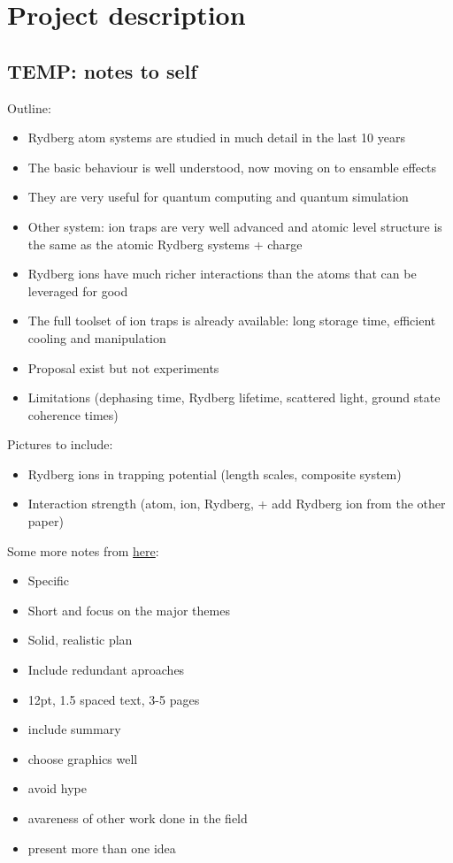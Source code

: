 \section{Project description}

\subsection{TEMP: notes to self}

Outline:

\begin{itemize}
 \item Rydberg atom systems are studied in much detail in the last 10 years
 \item The basic behaviour is well understood, now moving on to ensamble effects
 \item They are very useful for quantum computing and quantum simulation
 \item Other system: ion traps are very well advanced and atomic level structure is the same as the atomic Rydberg systems + charge
 \item Rydberg ions have much richer interactions than the atoms that can be leveraged for good
 \item The full toolset of ion traps is already available: long storage time, efficient cooling and manipulation
 \item Proposal exist but not experiments
 \item Limitations (dephasing time, Rydberg lifetime, scattered light, ground state coherence times)
\end{itemize}

Pictures to include:

\begin{itemize}
 \item Rydberg ions in trapping potential (length scales, composite system)
 \item Interaction strength (atom, ion, Rydberg, + add Rydberg ion from the other paper)
\end{itemize}


Some more notes from \href{http://sciencecareers.sciencemag.org/career_development/previous_issues/articles/1820/writing_a_research_plan}{here}:
\begin{itemize}
 \item Specific
 \item Short and focus on the major themes
 \item Solid, realistic plan
 \item Include redundant aproaches
 \item 12pt, 1.5 spaced text, 3-5 pages
 \item include summary
 \item choose graphics well
 \item avoid hype
 \item avareness of other work done in the field
 \item present more than one idea
\end{itemize}




